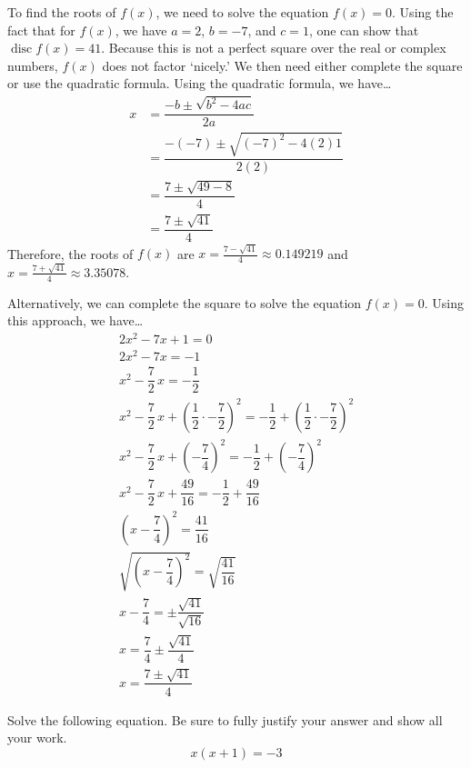 \documentclass[11pt,letterpaper]{article}
\DeclareMathOperator{\disc}{disc}
\begin{document}
\sol To find the roots of $f(x)$, we need to solve the equation $f(x)= 0$. Using the fact that for $f(x)$, we have $a= 2$, $b= -7$, and $c= 1$, one can show that $\disc f(x)= 41$. Because this is not a perfect square over the real or complex numbers, $f(x)$ does not factor `nicely.' We then need either complete the square or use the quadratic formula. Using the quadratic formula, we have\dots
	\[
	\begin{aligned}
	x&= \dfrac{-b \pm \sqrt{b^2 - 4ac}}{2a} \\
	&= \dfrac{-(-7) \pm \sqrt{(-7)^2 - 4(2)1}}{2(2)} \\
	&= \dfrac{7 \pm \sqrt{49 - 8}}{4} \\
	&= \dfrac{7 \pm \sqrt{41}}{4}
	\end{aligned}
	\]
Therefore, the roots of $f(x)$ are $x= \frac{7 - \sqrt{41}}{4} \approx 0.149219$ and $x= \frac{7 + \sqrt{41}}{4} \approx 3.35078$. \pspace

Alternatively, we can complete the square to solve the equation $f(x)= 0$. Using this approach, we have\dots
	\[
	\begin{gathered}
	2x^2 - 7x + 1= 0 \\
	2x^2 - 7x= -1 \\
	x^2 - \dfrac{7}{2}\, x=  -\dfrac{1}{2} \\
	x^2 - \dfrac{7}{2}\, x + \left( \dfrac{1}{2} \cdot -\dfrac{7}{2} \right)^2=  -\dfrac{1}{2} + \left( \dfrac{1}{2} \cdot -\dfrac{7}{2} \right)^2 \\
	x^2 - \dfrac{7}{2}\, x + \left( -\dfrac{7}{4} \right)^2=  -\dfrac{1}{2} + \left( -\dfrac{7}{4} \right)^2 \\
	x^2 - \dfrac{7}{2}\, x + \dfrac{49}{16}= -\dfrac{1}{2} + \dfrac{49}{16} \\
	\left(x - \dfrac{7}{4} \right)^2= \dfrac{41}{16} \\
	\sqrt{\left(x - \dfrac{7}{4} \right)^2}= \sqrt{\dfrac{41}{16}} \\
	x - \dfrac{7}{4}= \pm \dfrac{\sqrt{41}}{\sqrt{16}} \\
	x= \dfrac{7}{4} \pm \dfrac{\sqrt{41}}{4} \\
	x= \dfrac{7 \pm \sqrt{41}}{4}
	\end{gathered}
	\]



\newpage



 Solve the following equation. Be sure to fully justify your answer and show all your work.
	\[
	x(x + 1)= -3
	\] \pspace
\end{document}
